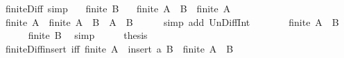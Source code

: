 \begin{isabellebody}
\endisatagproof
{\isafoldproof}%
%
\isadelimproof
\isanewline
%
\endisadelimproof
\isanewline
{}\isamarkupfalse%
\ finite{\isacharunderscore}{\kern0pt}Diff{}\ {\isacharbrackleft}{\kern0pt}simp{\isacharbrackright}{\kern0pt}{\isacharcolon}{\kern0pt}\isanewline
\ \ \ {\isachardoublequoteopen}finite\ B{\isachardoublequoteclose}\isanewline
\ \ \ {\isachardoublequoteopen}finite\ {\isacharparenleft}{\kern0pt}A\ {\isacharminus}{\kern0pt}\ B{\isacharparenright}{\kern0pt}\ {\isasymlongleftrightarrow}\ finite\ A{\isachardoublequoteclose}\isanewline
%
\isadelimproof
%
\endisadelimproof
%
\isatagproof
{}\isamarkupfalse%
\ {\isacharminus}{\kern0pt}\isanewline
\ \ \isamarkupfalse%
\ {\isachardoublequoteopen}finite\ A\ {\isasymlongleftrightarrow}\ finite\ {\isacharparenleft}{\kern0pt}{\isacharparenleft}{\kern0pt}A\ {\isacharminus}{\kern0pt}\ B{\isacharparenright}{\kern0pt}\ {\isasymunion}\ {\isacharparenleft}{\kern0pt}A\ {\isasyminter}\ B{\isacharparenright}{\kern0pt}{\isacharparenright}{\kern0pt}{\isachardoublequoteclose}\isanewline
\ \ \ \ \isamarkupfalse%
\ {\isacharparenleft}{\kern0pt}simp\ add{\isacharcolon}{\kern0pt}\ Un{\isacharunderscore}{\kern0pt}Diff{\isacharunderscore}{\kern0pt}Int{\isacharparenright}{\kern0pt}\isanewline
\ \ \isamarkupfalse%
\ \isamarkupfalse%
\ {\isachardoublequoteopen}{\isasymdots}\ {\isasymlongleftrightarrow}\ finite\ {\isacharparenleft}{\kern0pt}A\ {\isacharminus}{\kern0pt}\ B{\isacharparenright}{\kern0pt}{\isachardoublequoteclose}\isanewline
\ \ \ \ \isamarkupfalse%
\ {\isacartoucheopen}finite\ B{\isacartoucheclose}\ \isamarkupfalse%
\ simp\isanewline
\ \ \isamarkupfalse%
\ \isamarkupfalse%
\ {\isacharquery}{\kern0pt}thesis\ \isacommand{{\isachardot}{\kern0pt}{\isachardot}{\kern0pt}}\isamarkupfalse%
\isanewline
{}\isamarkupfalse%
%
\endisatagproof
{\isafoldproof}%
%
\isadelimproof
\isanewline
%
\endisadelimproof
\isanewline
{}\isamarkupfalse%
\ finite{\isacharunderscore}{\kern0pt}Diff{\isacharunderscore}{\kern0pt}insert\ {\isacharbrackleft}{\kern0pt}iff{\isacharbrackright}{\kern0pt}{\isacharcolon}{\kern0pt}\ {\isachardoublequoteopen}finite\ {\isacharparenleft}{\kern0pt}A\ {\isacharminus}{\kern0pt}\ insert\ a\ B{\isacharparenright}{\kern0pt}\ {\isasymlongleftrightarrow}\ finite\ {\isacharparenleft}{\kern0pt}A\ {\isacharminus}{\kern0pt}\ B{\isacharparenright}{\kern0pt}{\isachardoublequoteclose}\isanewline

\end{isabellebody}

